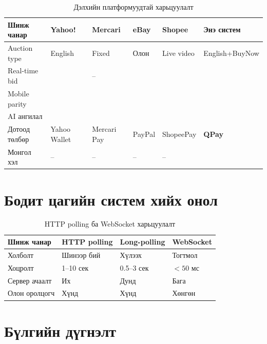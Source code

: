\documentclass[12pt, a4paper]{report}
\begin{document}
\begin{table}[H]
  \centering
  \caption{Дэлхийн платформуудтай харьцуулалт}
  \label{tab:global-comparison}
  \begin{tabularx}{\textwidth}{L{2.8cm}L{2.2cm}L{1.6cm}L{1.4cm}L{2cm}L{2.5cm}}
    \toprule
    \textbf{Шинж чанар} & \textbf{Yahoo!} & \textbf{Mercari} & \textbf{eBay} & \textbf{Shopee} & \textbf{Энэ систем} \\
    \midrule
    Auction type & English & Fixed & Олон & Live video & English+BuyNow \\
    Real-time bid &  & -- &  &  &  \\
    Mobile parity &  &  &  &  &  \\
    AI ангилал &  &  &  &  &  \\
    Дотоод төлбөр & Yahoo Wallet & Mercari Pay & PayPal & ShopeePay & \textbf{QPay} \\
    Монгол хэл & -- & -- & -- & -- & \textbf{} \\
    \bottomrule
  \end{tabularx}
\end{table}

\section{Бодит цагийн систем хийх онол}

\begin{table}[H]
  \centering
  \caption{HTTP polling ба WebSocket харьцуулалт}
  \label{tab:websocket-comparison}
  \begin{tabularx}{\textwidth}{L{3cm}C{3cm}C{3cm}C{3cm}}
    \toprule
    \textbf{Шинж чанар} & \textbf{HTTP polling} & \textbf{Long-polling} & \textbf{WebSocket} \\
    \midrule
    Холболт & Шинээр бий & Хүлээх & Тогтмол \\
    Хоцролт & 1--10 сек & 0.5--3 сек & $< 50$ мс \\
    Сервер ачаалт & Их & Дунд & Бага \\
    Олон оролцогч & Хүнд & Хүнд & Хөнгөн \\
    \bottomrule
  \end{tabularx}
\end{table}

\section{Бүлгийн дүгнэлт}
\end{document}
